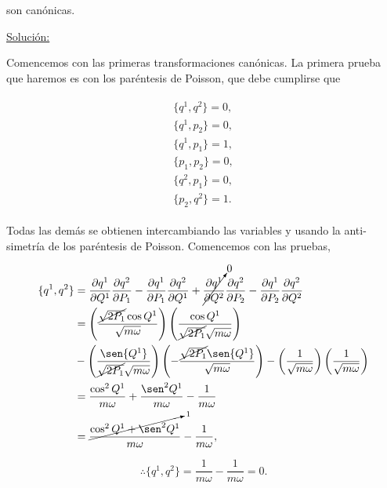 \documentclass[a4paper,10pt]{article}
\numberwithin{equation}{section}
\begin{document}
son canónicas.

\vspace{.3cm}

\underline{Solución:} \vspace{.3cm}

Comencemos con las primeras transformaciones canónicas. La primera prueba que haremos 
es con los paréntesis de Poisson, que debe cumplirse que 

\begin{align}
 \begin{split}
  \{q^1,q^2\} = 0, \\
  \{q^1,p_2\} = 0, \\
  \{q^1,p_1\} = 1, \\
  \{p_1,p_2\} = 0, \\
  \{q^2,p_1\} = 0, \\
  \{p_2, q^2\} = 1.
 \end{split}
\end{align}

Todas las demás se obtienen intercambiando las variables y usando la anti-simetría 
de los paréntesis de Poisson. Comencemos con las pruebas,

\begin{align*}
 \{q^1,q^2\} &= \frac{\partial q^1}{\partial Q^1}\frac{\partial q^2}{\partial P_1} - 
 \frac{\partial q^1}{\partial P_1}\frac{\partial q^2}{\partial Q^1} + 
 \cancelto{0}{\frac{\partial q^1}{\partial Q^2}}\frac{\partial q^2}{\partial P_2} -
 \frac{\partial q^1}{\partial P_2}\frac{\partial q^2}{\partial Q^2} \\
 &= \left(\frac{\cancel{\sqrt{2P_1}}\cos{Q^1}}{\sqrt{m\omega}} \right)
 \left(\frac{\cos{Q^1}}{\cancel{\sqrt{2P_1}}\sqrt{m\omega}} \right) \\
 &- \left(\frac{\sen{Q^1}}{\cancel{\sqrt{2P_1}}\sqrt{m\omega}} \right)
 \left(- \frac{\cancel{\sqrt{2P_1}}\sen{Q^1}}{\sqrt{m\omega}} \right) - 
 \left(\frac{1}{\sqrt{m\omega}}\right)\left(\frac{1}{\sqrt{m\omega}}\right) \\
 &= \frac{\cos^2{Q^1}}{m\omega} + \frac{\sen^2{Q^1}}{m\omega} - \frac{1}{m\omega} \\
 &= \frac{\cancelto{1}{\cos^2{Q^1} + \sen^2{Q^1}}}{m\omega} - \frac{1}{m\omega},
\end{align*}

\begin{equation}
 \therefore \{q^1,q^2\} = \frac{1}{m\omega} - \frac{1}{m\omega} = 0.
\end{equation}
\end{document}
